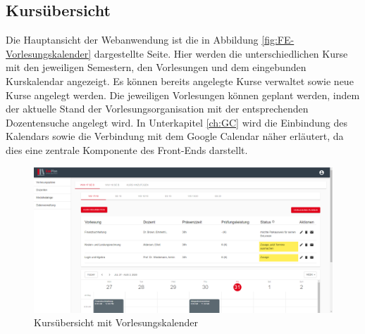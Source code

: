 \subsection{Kursübersicht}
Die Hauptansicht der Webanwendung ist die in Abbildung \vref{fig:FE-Vorlesungskalender} dargestellte Seite.
Hier werden die unterschiedlichen Kurse mit den jeweiligen Semestern, den Vorlesungen und dem eingebunden Kurskalendar angezeigt. 
Es können bereits angelegte Kurse verwaltet sowie neue Kurse angelegt werden. 
Die jeweiligen Vorlesungen können geplant werden, indem der aktuelle Stand der Vorlesungsorganisation mit der entsprechenden Dozentensuche angelegt wird.
In Unterkapitel \vref{ch:GC} wird die Einbindung des Kalendars sowie die Verbindung mit dem Google Calendar näher erläutert, da dies eine zentrale Komponente des Front-Ends darstellt.
\begin{figure}[H]
	\centering 
	\includegraphics[width=\textwidth]{img/FrontEnd/Vorlesungskalender.png}
	\caption[Kursübersicht mit Vorlesungskalender]{\label{fig:FE-Vorlesungskalender}Kursübersicht mit Vorlesungskalender}
\end{figure}

